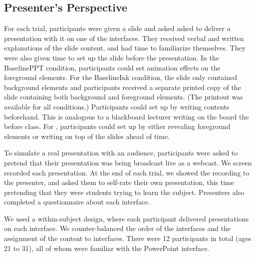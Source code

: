 \subsection{Presenter's Perspective}
For each trial, participants were given a slide and asked asked to deliver a presentation with it on one of the interfaces. They received verbal and written explanations of the slide content, and had time to familiarize themselves. They were also given time to set up the slide before the presentation. In the BaselinePPT condition, participants could set animation effects on the foreground elements. For the BaselineInk condition, the slide only contained background elements  and participants received a separate printed copy of the slide containing both background and foreground elements. (The printout was available for all conditions.) Participants could set up by writing contents beforehand. This is analogous to a blackboard lecturer writing on the board the before class. For \interface, participants could set up by either revealing foreground elements or writing on top of the slides ahead of time. 

To simulate a real presentation with an audience, participants were asked to pretend that their presentation was being broadcast live as a webcast. We screen recorded each presentation. At the end of each trial, we showed the recording to the presenter, and asked them to self-rate their own presentation, this time pretending that they were students trying to learn the subject. Presenters also completed a questionnaire about each interface.

We used a within-subject design, where each participant delivered presentations on each interface. We counter-balanced the order of the interfaces and the assignment of the content to interfaces. There were 12 participants in total (ages 21 to 31), all of whom were familiar with the PowerPoint interface. 

